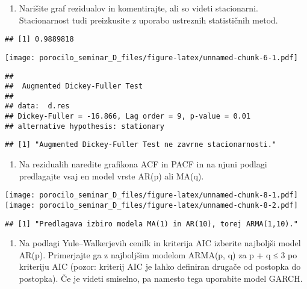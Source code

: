 \documentclass[
]{article}
\providecommand{\tightlist}{%
  \setlength{\itemsep}{0pt}\setlength{\parskip}{0pt}}
\begin{document}
\begin{enumerate}
\def\labelenumi{\arabic{enumi}.}
\setcounter{enumi}{2}
\tightlist
\item
  Narišite graf rezidualov in komentirajte, ali so videti stacionarni.
  Stacionarnost tudi preizkusite z uporabo ustreznih statističnih metod.
\end{enumerate}

\begin{verbatim}
## [1] 0.9889818
\end{verbatim}

\texttt{[image: porocilo\_seminar\_D\_files/figure-latex/unnamed-chunk-6-1.pdf]}

\begin{verbatim}
## 
##  Augmented Dickey-Fuller Test
## 
## data:  d.res
## Dickey-Fuller = -16.866, Lag order = 9, p-value = 0.01
## alternative hypothesis: stationary
\end{verbatim}

\begin{verbatim}
## [1] "Augmented Dickey-Fuller Test ne zavrne stacionarnosti."
\end{verbatim}

\begin{enumerate}
\def\labelenumi{\arabic{enumi}.}
\setcounter{enumi}{3}
\tightlist
\item
  Na rezidualih naredite grafikona ACF in PACF in na njuni podlagi
  predlagajte vsaj en model vrste AR(p) ali MA(q).
\end{enumerate}

\texttt{[image: porocilo\_seminar\_D\_files/figure-latex/unnamed-chunk-8-1.pdf]}
\texttt{[image: porocilo\_seminar\_D\_files/figure-latex/unnamed-chunk-8-2.pdf]}

\begin{verbatim}
## [1] "Predlagava izbiro modela MA(1) in AR(10), torej ARMA(1,10)."
\end{verbatim}

\begin{enumerate}
\def\labelenumi{\arabic{enumi}.}
\setcounter{enumi}{4}
\tightlist
\item
  Na podlagi Yule--Walkerjevih cenilk in kriterija AIC izberite
  najboljši model AR(p). Primerjajte ga z najboljšim modelom ARMA(p, q)
  za p + q ≤ 3 po kriteriju AIC (pozor: kriterij AIC je lahko definiran
  drugače od postopka do postopka). Če je videti smiselno, pa namesto
  tega uporabite model GARCH.
\end{enumerate}
\end{document}
